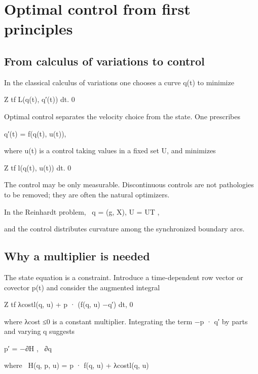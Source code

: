 \chapter{Optimal control from first principles}
\section{From calculus of variations to control}

In the classical calculus of variations one chooses a curve q(t) to minimize


Z tf L(q(t), q′(t)) dt. 0


Optimal control separates the velocity choice from the state. One prescribes


q′(t) = f(q(t), u(t)),


where u(t) is a control taking values in a fixed set U, and minimizes


Z tf l(q(t), u(t)) dt. 0


The control may be only measurable. Discontinuous controls are not pathologies to be removed; they are often the natural optimizers.


\begin{displaytext}
In the Reinhardt problem, \
q = (g, X), U = UT ,
\end{displaytext}

and the control distributes curvature among the synchronized boundary arcs.


\section{Why a multiplier is needed}

The state equation is a constraint. Introduce a time-dependent row vector or covector p(t) and consider the augmented integral


Z tf λcostl(q, u) + p · (f(q, u) −q′) dt, 0


\begin{displaytext}
where λcost ≤0 is a constant multiplier. Integrating the term −p · q′ by parts and varying q suggests
\end{displaytext}

\begin{displaytext}
p′ = −∂H , \
∂q
\end{displaytext}

\begin{displaytext}
where \
H(q, p, u) = p · f(q, u) + λcostl(q, u)
\end{displaytext}

